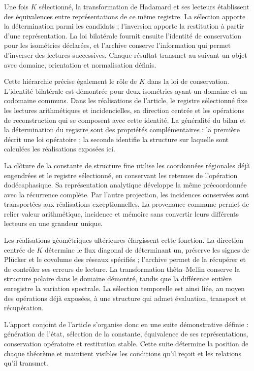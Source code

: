 Une fois \(K\) sélectionné, la transformation de Hadamard et ses lecteurs établissent des équivalences entre représentations de ce même registre. La sélection apporte la détermination parmi les candidats ; l'inversion apporte la restitution à partir d'une représentation. La loi bilatérale fournit ensuite l'identité de conservation pour les isométries déclarées, et l'archive conserve l'information qui permet d'inverser des lectures successives. Chaque résultat transmet au suivant un objet avec domaine, orientation et normalisation définis.

Cette hiérarchie précise également le rôle de \(K\) dans la loi de
conservation. L’identité bilatérale est démontrée pour deux isométries
ayant un domaine et un codomaine communs. Dans les réalisations de l’article, le
registre sélectionné fixe les lectures arithmétiques et incidencielles,
sa direction centrée et les opérations de reconstruction qui se
composent avec cette identité. La généralité du bilan et la
détermination du registre sont des propriétés complémentaires : la première
décrit une loi opératoire ; la seconde identifie la structure sur
laquelle sont calculées les réalisations exposées ici.

La clôture de la constante de structure fine utilise les coordonnées
régionales déjà engendrées et le registre sélectionné, en conservant les
retenues de l’opération dodécaphasique. Sa représentation analytique
développe la même précoordonnée avec la récurrence complète. Par
l’autre projection, les incidences conservées sont transportées aux
réalisations exceptionnelles. La provenance commune permet de relier
valeur arithmétique, incidence et mémoire sans convertir leurs différents
lecteurs en une grandeur unique.

Les réalisations géométriques ultérieures élargissent cette fonction. La direction centrée de \(K\) détermine le flux diagonal de déterminant un, préserve les signes de Plücker et le covolume des réseaux spécifiés ; l'archive permet de la récupérer et de contrôler ses erreurs de lecture. La transformation thêta--Mellin conserve la structure polaire dans le domaine démontré, tandis que la différence entière enregistre la variation spectrale. La sélection temporelle est ainsi liée, au moyen des opérations déjà exposées, à une structure qui admet évaluation, transport et récupération.

L’apport conjoint de l’article s’organise donc en une
suite démonstrative définie : génération de l’état, sélection de la
constante, équivalence de ses représentations, conservation opératoire
et restitution stable. Cette suite détermine la position de chaque
théorème et maintient visibles les conditions qu’il reçoit et les relations
qu’il transmet.
